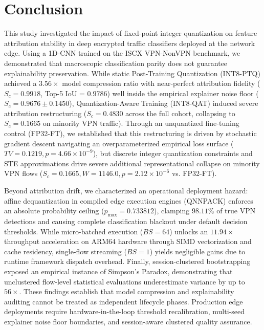 \documentclass[conference]{IEEEtran}
\begin{document}
\section{Conclusion}
This study investigated the impact of fixed-point integer quantization on feature attribution stability in deep encrypted traffic classifiers deployed at the network edge. Using a 1D-CNN trained on the ISCX VPN-NonVPN benchmark, we demonstrated that macroscopic classification parity does not guarantee explainability preservation. While static Post-Training Quantization (INT8-PTQ) achieved a $3.56\times$ model compression ratio with near-perfect attribution fidelity ($S_c = 0.9918$, Top-5 IoU = $0.9786$) well inside the empirical explainer noise floor ($S_c = 0.9676 \pm 0.1450$), Quantization-Aware Training (INT8-QAT) induced severe attribution restructuring ($S_c = 0.4830$ across the full cohort, collapsing to $S_c = 0.1665$ on minority VPN traffic). Through an unquantized fine-tuning control (FP32-FT), we established that this restructuring is driven by stochastic gradient descent navigating an overparameterized empirical loss surface ($TV = 0.1219, p = 4.66 \times 10^{-9}$), but discrete integer quantization constraints and STE approximations drive severe additional representational collapse on minority VPN flows ($S_c = 0.1665, W = 1146.0, p = 2.12 \times 10^{-6}$ vs. FP32-FT).

Beyond attribution drift, we characterized an operational deployment hazard: affine dequantization in compiled edge execution engines (QNNPACK) enforces an absolute probability ceiling ($p_{\max} = 0.733812$), clamping $98.11\%$ of true VPN detections and causing complete classification blackout under default decision thresholds. While micro-batched execution ($BS=64$) unlocks an $11.94\times$ throughput acceleration on ARM64 hardware through SIMD vectorization and cache residency, single-flow streaming ($BS=1$) yields negligible gains due to runtime framework dispatch overhead. Finally, session-clustered bootstrapping exposed an empirical instance of Simpson's Paradox, demonstrating that unclustered flow-level statistical evaluations underestimate variance by up to $56\times$. These findings establish that model compression and explainability auditing cannot be treated as independent lifecycle phases. Production edge deployments require hardware-in-the-loop threshold recalibration, multi-seed explainer noise floor boundaries, and session-aware clustered quality assurance.
\end{document}
